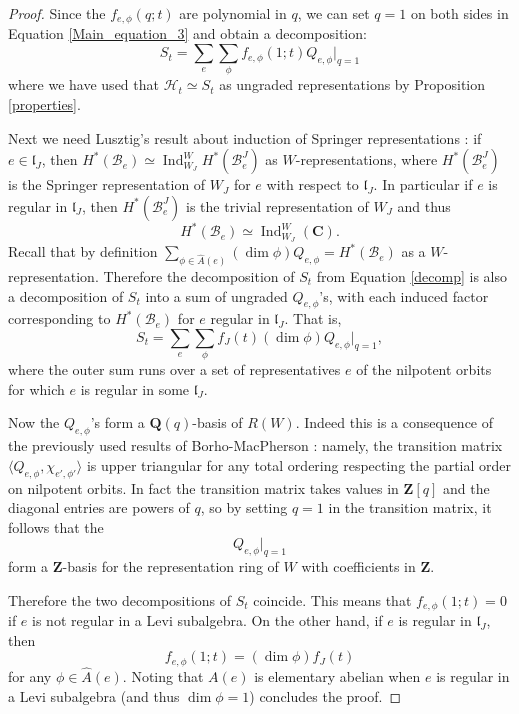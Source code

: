 \documentclass[10pt]{amsart}
\newcommand{\complex}{\mathbf C}
\newcommand{\zz}{\mathbf Z}
\newcommand{\qq}{\mathbf Q}
\newcommand{\levi}{\mathfrak l}
\newcommand{\ar}{{\hat{A}}(e)}
\renewcommand{\H}{{\mathcal{H}_t}}
\newcommand{\flag}{{\mathcal B}}
\DeclareMathOperator{\Ind}{Ind}
\theoremstyle{plain}
\theoremstyle{definition}
\theoremstyle{remark}
\begin{document}
\begin{proof}
Since the $f_{e, \phi}(q; t)$ are polynomial in $q$, we can set $q=1$ on both sides 
in Equation \ref{Main_equation_3} and obtain a decomposition:
$$S_t = \sum_{e}  \sum_{\phi} f_{e, \phi}(1;t) Q_{e, \phi}\big|_{q=1}$$
where we have used that 
$\H \simeq S_t$ as ungraded representations
by Proposition \ref{properties}.

Next we need Lusztig's result about induction of Springer representations \cite{lusztig:induction}:
if $e \in \levi_J$, then 
$H^*(\flag_e) \simeq \Ind_{W_J}^W H^*(\flag^J_e)$ as $W$-representations,
where $H^*(\flag^J_e)$ is the Springer representation of $W_J$ for $e$ with respect to $\levi_J$.
In particular if $e$ is regular in $\levi_J$, then $H^*(\flag^J_e)$ is the trivial representation of $W_J$ and thus
\begin{equation} \label{gyuri_induct}
H^*(\flag_e) \simeq \Ind_{W_J}^W( \complex).
\end{equation}
Recall that by definition $\sum_{\phi \in \ar}  (\dim \phi) Q_{e, \phi} = H^*(\flag_e)$ as  a $W$-representation.
Therefore the decomposition of $S_t$ from Equation \ref{decomp} is also a decomposition of 
$S_t$ into a sum of ungraded $Q_{e,\phi}$'s, with each induced factor corresponding to $H^*(\flag_e)$ for $e$ regular in $\levi_J$. 
That is,
$$S_t = \sum_{e}  \sum_{\phi} f_J(t)(\dim \phi) Q_{e, \phi}\big|_{q=1},$$
where the outer sum runs over a set of representatives $e$ of the nilpotent orbits for which $e$ is regular 
in some $\levi_J$.

Now the $Q_{e, \phi}$'s form a $\qq(q)$-basis of $R(W)$. 
Indeed this is a consequence of the previously used results of Borho-MacPherson \cite{borho-mac}:  namely, the transition matrix $\langle Q_{e,\phi}, \chi_{e', \phi'} \rangle$ is upper triangular for any total ordering respecting the partial order on nilpotent orbits.  
In fact the transition matrix takes values in $\zz[q]$ and the diagonal entries are powers of $q$,
so by setting $q=1$ in the transition matrix, it follows that the 
$$Q_{e, \phi}\big|_{q=1}$$ form a $\zz$-basis for the representation ring of $W$ with coefficients in $\zz$.  

Therefore the two decompositions of $S_t$ coincide.  This means that 
$f_{e, \phi}(1;t) =0$ if $e$ is not regular in a Levi subalgebra. 
On the other hand, if $e$ is regular in $\levi_J$, 
then $$f_{e, \phi}(1;t) =  (\dim \phi) f_J(t)$$ for any $\phi \in \ar$.  
Noting that $A(e)$ is elementary abelian when $e$ is regular in a Levi subalgebra (and thus $\dim \phi =1$) concludes the proof.
\end{proof}
\end{document}
